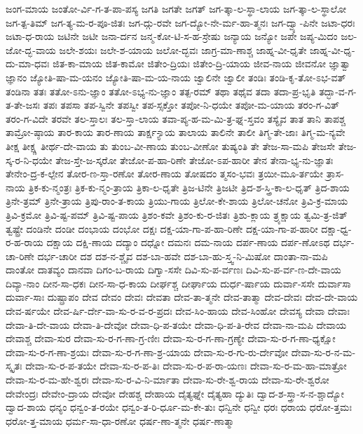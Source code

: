 {ಜಂಗ-ಮಾಯ
ಜಂತೋ-ರ್ವಿ-ಗ-ತ-ಪಾ-ಪಸ್ಯ
ಜಗತಿ
ಜಗತೇ
ಜಗತ್
ಜಗ-ತ್ಕಾ-ಲ-ಸ್ಥಾ-ಲಾಯ
ಜಗ-ತ್ಕಾ-ಲ-ಸ್ಥಾಲೋ
ಜಗ-ತ್ಪ-ತಿಮ್
ಜಗ-ತ್ಯ-ಮ-ರ-ಪೂ-ಜಿತಃ
ಜಗ-ದ್ಗು-ರವೇ
ಜಗ-ದ್ಯೋ-ನೇ-ರ್ಮ-ಹಾ-ತ್ಮನಃ
ಜಗ-ದ್ವ್ಯಾ-ಪಿನೇ
ಜಟಾ-ಧರಃ
ಜಟಾ-ಧ-ರಾಯ
ಜಟಿನೇ
ಜಟೀ
ಜನಾ-ರ್ದನ
ಜನ್ಮ-ಕೋ-ಟಿ-ಸ-ಹ-ಸ್ರೇಷು
ಜನ್ಯಾಯ
ಜನ್ಯೋ
ಜಪೇ
ಜಪ್ಯ-ಮಿದಂ
ಜಲ-ಜೋ-ದ್ಭ-ವಾಯ
ಜಲೇ-ಶಯಃ
ಜಲೇ-ಶ-ಯಾಯ
ಜಲೋ-ದ್ಭವಃ
ಜಾಗ್ರ-ಮಾ-ಣಾಶ್ಚ
ಜಾಹ್ನ-ವೀ-ಧೃತೇ
ಜಾಹ್ನ-ವೀ-ಧೃ-ದು-ಮಾ-ಧವಃ
ಜಿತ-ಕಾ-ಮಾಯ
ಜಿತ-ಕಾಮೋ
ಜಿತೇಂ-ದ್ರಿಯಃ
ಜಿತೇಂ-ದ್ರಿ-ಯಾಯ
ಜೀವ-ನಾಯ
ಜೀವನೋ
ಜ್ಞಾತ್ವಾ
ಜ್ಞಾನಂ
ಜ್ಯೋತಿ-ಷಾ-ಮ-ಯನಂ
ಜ್ಯೋತಿ-ಷಾ-ಮ-ಯ-ನಾಯ
ಜ್ವಾಲಿನೇ
ಜ್ವಾಲೀ
ತಂಡಿಃ
ತಂಡಿ-ಕೃ-ತೋ-ಽಭ-ವತ್
ತಂಡಿನಾ
ತತಃ
ತತೋ-ಽನು-ಜ್ಞಾಂ
ತತೋ-ಽಭ್ಯ-ನು-ಜ್ಞಾಂ
ತತ್ಪ-ರಮ್
ತಥಾ
ತಥೈವ
ತದಾ
ತದಾ-ಪ್ರ-ಭೃತಿ
ತದ್ಭಾ-ವ-ಗ-ತ-ತೇ-ಜಸಃ
ತಪಃ
ತಪಸಾ
ತಪ-ಸ್ವಿನೇ
ತಪಸ್ವೀ
ತಪ-ಸ್ಸಕ್ತೋ
ತಪೋ-ನಿ-ಧಯೇ
ತಪೋ-ಮ-ಯಾಯ
ತರಂ-ಗ-ವಿತ್
ತರಂ-ಗ-ವಿದೇ
ತರವೇ
ತಲ-ಸ್ತಾಲಃ
ತಲ-ಸ್ತಾ-ಲಾಯ
ತವಾ-ಪ್ಯ-ಹ-ಮ-ಮಿ-ತ್ರ-ಘ್ನ-ಸ್ತವಂ
ತಸ್ಯೈವ
ತಾತ
ತಾನಿ
ತಾಪಶ್ಚ
ತಾಮ್ರೋ-ಷ್ಠಾಯ
ತಾರ-ಕಾಯ
ತಾರ-ಣಾಯ
ತಾರ್ಕ್ಷ-್ಯಾಯ
ತಾಲಾಯ
ತಾಲಿನೇ
ತಾಲೀ
ತಿಗ್ಮ-ತೇ-ಜಾಃ
ತಿಗ್ಮ-ಮ-ನ್ಯವೇ
ತೀಕ್ಷ
ತೀಕ್ಷ್ಣ
ತೀರ್ಥ-ದೇ-ವಾಯ
ತು
ತುಂಬ-ವೀ-ಣಾಯ
ತುಂಬ-ವೀಣೋ
ತುಷ್ಯಂತಿ
ತೇ
ತೇಜ-ಸಾ-ಮಪಿ
ತೇಜಸೇ
ತೇಜ-ಸ್ಕ-ರ-ನಿ-ಧಯೇ
ತೇಜ-ಸ್ತೇ-ಜ-ಸ್ಕರೋ
ತೇಜೋ-ಪ-ಹಾ-ರಿಣೇ
ತೇಜೋ-ಽಪ-ಹಾರೀ
ತೇನ
ತೇನಾ-ಭ್ಯ-ನು-ಜ್ಞಾತಃ
ತೇನೇಂ-ದ್ರ-ಕ-ಲ್ಪೇನ
ತೋರ-ಣ-ಸ್ತಾ-ರಣೋ
ತೋರ-ಣಾಯ
ತೋಷದಂ
ತ್ಮಸಂ-ಭವಃ
ತ್ರಯೀ-ಮೂ-ರ್ತಯೇ
ತ್ರಾಸ-ನಾಯ
ತ್ರಿಕ-ಕು-ನ್ಮಂತ್ರಃ
ತ್ರಿಕ-ಕು-ನ್ಮಂ-ತ್ರಾಯ
ತ್ರಿಕಾ-ಲ-ಧೃತೇ
ತ್ರಿಜ-ಟಿನೇ
ತ್ರಿಜಟೀ
ತ್ರಿದ-ಶ-ಸ್ತ್ರಿ-ಕಾ-ಲ-ಧೃತ್
ತ್ರಿದ-ಶಾಯ
ತ್ರಿನೇ-ತ್ರಮ್
ತ್ರಿನೇ-ತ್ರಾಯ
ತ್ರಿಪು-ರಾಂ-ತ-ಕಾಯ
ತ್ರಿಯು-ಗಾಯ
ತ್ರಿಲೋ-ಕೇ-ಶಾಯ
ತ್ರಿಲೋ-ಚನೋ
ತ್ರಿವಿ-ಕ್ರ-ಮಾಯ
ತ್ರಿವಿ-ಕ್ರಮೋ
ತ್ರಿವಿ-ಷ್ಟ-ಪಮ್
ತ್ರಿವಿ-ಷ್ಟ-ಪಾಯ
ತ್ರಿಶಂ-ಕವೇ
ತ್ರಿಶಂ-ಕು-ರ-ಜಿತಃ
ತ್ರಿಶು-ಕ್ಲಾಯ
ತ್ರ್ಯಕ್ಷಾಯ
ತ್ವಮಿ-ತ್ರ-ಜಿತ್
ತ್ವಷ್ಟ್ರೇ
ದಂಡಿನೇ
ದಂಡೀ
ದಂಭಾಯ
ದಂಭೋ
ದಕ್ಷಃ
ದಕ್ಷ-ಯಾ-ಗಾ-ಪ-ಹಾ-ರಿಣೇ
ದಕ್ಷ-ಯಾ-ಗಾ-ಪ-ಹಾರೀ
ದಕ್ಷಾ-ಧ್ವ-ರ-ಹ-ರಾಯ
ದಕ್ಷಾಯ
ದಕ್ಷಿ-ಣಾಯ
ದದ್ಯಾಂ
ದಧ್ನೋ
ದಮನಃ
ದಮ-ನಾಯ
ದರ್ಪ-ಣಾಯ
ದರ್ಪ-ಣೋಽಥ
ದರ್ಭ-ಚಾ-ರಿಣೇ
ದರ್ಭ-ಚಾರೀ
ದಶ
ದಶ-ನ-ಶ್ಚೈವ
ದಶ-ಬಾ-ಹವೇ
ದಶ-ಬಾ-ಹು-ಸ್ತ್ವ-ನಿ-ಮಿಷೋ
ದಾಂತಾ-ನಾ-ಮಪಿ
ದಾಂತೋ
ದಾತವ್ಯಂ
ದಾನವಾ
ದಿಗಂ-ಬ-ರಾಯ
ದಿಗ್ವಾ-ಸಸೇ
ದಿವಿ-ಸು-ಪ-ರ್ವಣಃ
ದಿವಿ-ಸು-ಪ-ರ್ವ-ಣ-ದೇ-ವಾಯ
ದಿವ್ಯಾ-ನಾಂ
ದೀನ-ಸಾ-ಧಕಃ
ದೀನ-ಸಾ-ಧ-ಕಾಯ
ದೀರ್ಘಶ್ಚ
ದೀರ್ಘಾಯ
ದುರ್ಧ-ರ್ಷಾಯ
ದುರ್ವಾ-ಸಸೇ
ದುರ್ವಾಸಾ
ದುರ್ವಾ-ಸಾಃ
ದುಷ್ಪ್ರಾಪಂ
ದೇವ
ದೇವಂ
ದೇವಃ
ದೇವತಾ
ದೇವ-ತಾ-ತ್ಮನೇ
ದೇವ-ತಾತ್ಮಾ
ದೇವ-ದೇವಃ
ದೇವ-ದೇ-ವಾಯ
ದೇವ-ರ್ಷಯೇ
ದೇವ-ರ್ಷಿ-ರ್ದೇ-ವಾ-ಸು-ರ-ವ-ರ-ಪ್ರದಃ
ದೇವ-ಸಿಂ-ಹಾಯ
ದೇವ-ಸಿಂಹೋ
ದೇವಸ್ಯ
ದೇವಾ
ದೇವಾಃ
ದೇವಾ-ತಿ-ದೇ-ವಾಯ
ದೇವಾ-ತಿ-ದೇವೋ
ದೇವಾ-ಧಿ-ಪ-ತಯೇ
ದೇವಾ-ಧಿ-ಪ-ತಿ-ರೇವ
ದೇವಾ-ನಾ-ಮಪಿ
ದೇವಾಯ
ದೇವಾಶ್ಚ
ದೇವಾ-ಸುರ
ದೇವಾ-ಸು-ರ-ಗ-ಣಾ-ಗ್ರ-ಣೀಃ
ದೇವಾ-ಸು-ರ-ಗ-ಣಾ-ಗ್ರಣ್ಯೇ
ದೇವಾ-ಸು-ರ-ಗ-ಣಾ-ಧ್ಯಕ್ಷೋ
ದೇವಾ-ಸು-ರ-ಗ-ಣಾ-ಶ್ರಯಃ
ದೇವಾ-ಸು-ರ-ಗ-ಣಾ-ಶ್ರ-ಯಾಯ
ದೇವಾ-ಸು-ರ-ಗು-ರು-ರ್ದೇವೋ
ದೇವಾ-ಸು-ರ-ನ-ಮ-ಸ್ಕೃತಃ
ದೇವಾ-ಸು-ರ-ಪ-ತಯೇ
ದೇವಾ-ಸು-ರ-ಪ-ತಿಃ
ದೇವಾ-ಸು-ರ-ಪ-ರಾ-ಯಣಃ
ದೇವಾ-ಸು-ರ-ಮ-ಹಾ-ಮಾತ್ರೋ
ದೇವಾ-ಸು-ರ-ಮ-ಹೇ-ಶ್ವರಃ
ದೇವಾ-ಸು-ರ-ವಿ-ನಿ-ರ್ಮಾತಾ
ದೇವಾ-ಸು-ರೇ-ಶ್ವ-ರಾಯ
ದೇವಾ-ಸು-ರೇ-ಶ್ವರೋ
ದೇವೇಂದ್ರಃ
ದೇವೇಂ-ದ್ರಾಯ
ದೇವೋ
ದೇಹಶ್ಚ
ದೇಹಾಯ
ದೈತ್ಯಘ್ನೇ
ದೈತ್ಯಹಾ
ದ್ಯುತಿಃ
ದ್ವಾದ-ಶ-ಸ್ತ್ರಾ-ಸ-ನ-ಶ್ಚಾದ್ಯೋ
ದ್ವಾದ-ಶಾಯ
ಧನ್ಯಂ
ಧನ್ವಂ-ತ-ರಯೇ
ಧನ್ವಂ-ತ-ರಿ-ರ್ಧೂ-ಮ-ಕೇ-ತುಃ
ಧನ್ವಿನೇ
ಧನ್ವೀ
ಧರಃ
ಧರಾಯ
ಧರೋ-ತ್ತಮಃ
ಧರೋ-ತ್ತ-ಮಾಯ
ಧರ್ಮ-ಸಾ-ಧಾ-ರಣೋ
ಧರ್ಷ-ಣಾ-ತ್ಮನೇ
ಧರ್ಷ-ಣಾತ್ಮಾ
}
